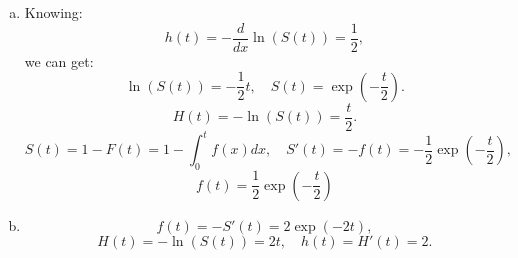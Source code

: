 \documentclass[12pt]{elegantbook}
\begin{document}
    \begin{solution}
        \begin{enumerate}[(a)]
            \item  Knowing: 
            \[h(t)=-\frac{d}{d x} \ln(S(t))=\frac{1}{2}, \]
            we can get: 
            \[\ln(S(t))=-\frac{1}{2}t,\quad S(t)=\exp\left(-\frac{t}{2}\right). \]
            \[H(t)=-\ln(S(t))=\frac{t}{2}. \]
            \[S(t)=1-F(t)=1-\int_0^t f(x) dx, \quad S'(t)=-f(t)=-\frac{1}{2}\exp\left(-\frac{t}{2}\right), \]
            \[f(t)=\frac{1}{2}\exp\left(-\frac{t}{2}\right)\]
            \item \[f(t)=-S'(t)=2\exp\left(-2t\right), \]
            \[H(t)=-\ln(S(t))=2t, \quad h(t)=H'(t)=2. \]
        \end{enumerate}
    \end{solution}
    
\end{document}
